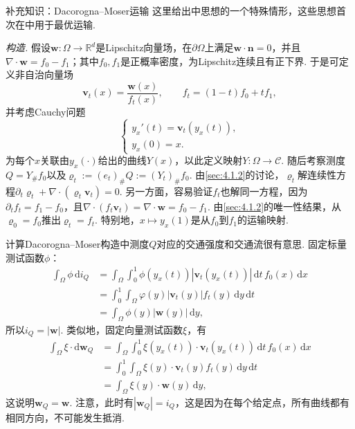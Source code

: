 \begin{sourcebox}{补充知识：Dacorogna--Moser运输}\label{box:4.3}
这里给出\cite{b132}中思想的一个特殊情形，这些思想首次在\cite{b159}中用于最优运输.

\emph{构造.} 假设$\mathbf w:\Omega\to\mathbb R^d$是Lipschitz向量场，在$\partial\Omega$上满足$\mathbf w\cdot\mathbf n=0$，并且$\nabla\cdot\mathbf w=f_0-f_1$；其中$f_0,f_1$是正概率密度，为Lipschitz连续且有正下界. 于是可定义非自治向量场
\[
 \mathbf v_t(x)=\frac{\mathbf w(x)}{f_t(x)},\qquad
 f_t=(1-t)f_0+tf_1,
\]
并考虑Cauchy问题
\[
 \begin{cases}
 y_x'(t)=\mathbf v_t(y_x(t)),\\
 y_x(0)=x.
 \end{cases}
\]
为每个$x$关联由$y_x(\cdot)$给出的曲线$Y(x)$，以此定义映射$Y:\Omega\to\mathscr C$. 随后考察测度$Q=Y_\#f_0$以及$\varrho_t:=(e_t)_\#Q:=(Y_t)_\#f_0$. 由\autoref{sec:4.1.2}的讨论，$\varrho_t$解连续性方程$\partial_t\varrho_t+\nabla\cdot(\varrho_t\mathbf v_t)=0$. 另一方面，容易验证$f_t$也解同一方程，因为$\partial_tf_t=f_1-f_0$，且$\nabla\cdot(f_t\mathbf v_t)=\nabla\cdot\mathbf w=f_0-f_1$. 由\autoref{sec:4.1.2}的唯一性结果，从$\varrho_0=f_0$推出$\varrho_t=f_t$. 特别地，$x\mapsto y_x(1)$是从$f_0$到$f_1$的运输映射.
\end{sourcebox}

计算Dacorogna--Moser构造中测度$Q$对应的交通强度和交通流很有意思. 固定标量测试函数$\phi$：
\begin{equation*}
\begin{aligned}
 \int_\Omega\phi\,\mathrm di_Q
 &=\int_\Omega\int_0^1\phi(y_x(t))|\mathbf v_t(y_x(t))|
                                  \,\mathrm dt\,f_0(x)\,\mathrm dx\\
 &=\int_0^1\int_\Omega\varphi(y)|\mathbf v_t(y)|f_t(y)\,\mathrm dy\,\mathrm dt\\
 &=\int_\Omega\phi(y)|\mathbf w(y)|\,\mathrm dy,
\end{aligned}
\end{equation*}
所以$i_Q=|\mathbf w|$. 类似地，固定向量测试函数$\xi$，有
\begin{equation*}
\begin{aligned}
 \int_\Omega\xi\cdot\mathrm d\mathbf w_Q
 &=\int_\Omega\int_0^1\xi(y_x(t))\cdot\mathbf v_t(y_x(t))
                                  \,\mathrm dt\,f_0(x)\,\mathrm dx\\
 &=\int_0^1\int_\Omega\xi(y)\cdot\mathbf v_t(y)f_t(y)\,\mathrm dy\,\mathrm dt\\
 &=\int_\Omega\xi(y)\cdot\mathbf w(y)\,\mathrm dy,
\end{aligned}
\end{equation*}
这说明$\mathbf w_Q=\mathbf w$. 注意，此时有$|\mathbf w_Q|=i_Q$，这是因为在每个给定点，所有曲线都有相同方向，不可能发生抵消.


